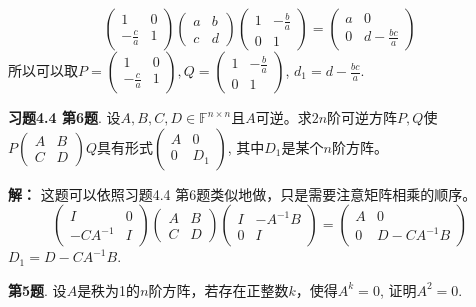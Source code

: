 $$\begin{pmatrix} 1 & 0 \\ -\frac{c}{a} & 1 \end{pmatrix} \begin{pmatrix} a & b \\ c & d \end{pmatrix} \begin{pmatrix} 1 & -\frac{b}{a} \\ 0 & 1 \end{pmatrix} = \begin{pmatrix} a & 0 \\ 0 & d - \frac{bc}{a} \end{pmatrix}$$
所以可以取$P = \begin{pmatrix} 1 & 0 \\ -\frac{c}{a} & 1 \end{pmatrix}, Q = \begin{pmatrix} 1 & -\frac{b}{a} \\ 0 & 1 \end{pmatrix}$, $d_1 = d - \frac{bc}{a}$.

\newpageorvspace

{\bf 习题4.4 第6题}. 设$A,B,C,D\in\mathbb{F}^{n\times n}$且$A$可逆。求$2n$阶可逆方阵$P,Q$使$P\begin{pmatrix} A & B \\ C & D \end{pmatrix}Q$具有形式$\begin{pmatrix} A & 0 \\ 0 & D_1 \end{pmatrix}$, 其中$D_1$是某个$n$阶方阵。

{\bf 解：} 这题可以依照习题4.4 第6题类似地做，只是需要注意矩阵相乘的顺序。
$$\begin{pmatrix} I & 0 \\ -CA^{-1} & I \end{pmatrix} \begin{pmatrix} A & B \\ C & D \end{pmatrix} \begin{pmatrix} I & -A^{-1}B \\ 0 & I \end{pmatrix} = \begin{pmatrix} A & 0 \\ 0 & D - CA^{-1}B \end{pmatrix}$$
$D_1 = D - CA^{-1}B$.

\newpageorvspace

{\bf 第5题}. 设$A$是秩为1的$n$阶方阵，若存在正整数$k$，使得$A^k = 0$, 证明$A^2 = 0$.

